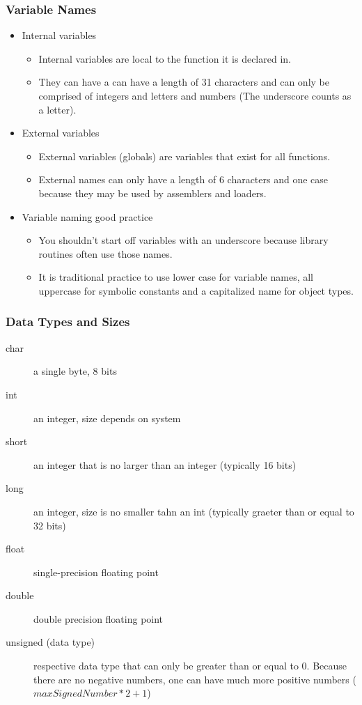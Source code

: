 \subsubsection{Variable Names}
\begin{itemize}[--] %
	\item Internal variables
		\begin{itemize}
			\item Internal variables are local to the function it is declared in. 
			\item They can have a can have a length of 31 characters and can only be comprised of integers and letters and numbers (The underscore counts as a letter). 
		\end{itemize}

	\item External variables
		\begin{itemize}
			\item External variables (globals) are variables that exist for all functions. 
			\item External names can only have a length of 6 characters and one case because they may be used by assemblers and loaders.
		\end{itemize}

	\item Variable naming good practice
		\begin{itemize}
			\item You shouldn't start off variables with an underscore because library routines often use those names. 
			\item It is traditional practice to use lower case for variable names, all uppercase for symbolic constants and a capitalized name for object types. 
		\end{itemize}
\end{itemize}


\subsubsection{Data Types and Sizes}
\begin{description} 
	\item[char] a single byte, 8 bits
	\item[int] an integer, size depends on system
	\item[short] an integer that is no larger than an integer (typically 16 bits)
	\item[long] an integer, size is no smaller tahn an int (typically graeter than or equal to 32 bits)
	\item[float] single-precision floating point
	\item[double] double precision floating point
	\item[unsigned (data type)] respective data type that can only be greater than or equal to 0. Because there are no negative numbers, one can have much more positive numbers ($maxSignedNumber * 2 + 1$) 
\end{description}


